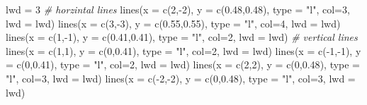 \documentclass[
]{book}
\newenvironment{Shaded}{\begin{snugshade}}{\end{snugshade}}
\newcommand{\AttributeTok}[1]{\textcolor[rgb]{0.77,0.63,0.00}{#1}}
\newcommand{\CommentTok}[1]{\textcolor[rgb]{0.56,0.35,0.01}{\textit{#1}}}
\newcommand{\DecValTok}[1]{\textcolor[rgb]{0.00,0.00,0.81}{#1}}
\newcommand{\FloatTok}[1]{\textcolor[rgb]{0.00,0.00,0.81}{#1}}
\newcommand{\FunctionTok}[1]{\textcolor[rgb]{0.00,0.00,0.00}{#1}}
\newcommand{\NormalTok}[1]{#1}
\newcommand{\OtherTok}[1]{\textcolor[rgb]{0.56,0.35,0.01}{#1}}
\newcommand{\SpecialCharTok}[1]{\textcolor[rgb]{0.00,0.00,0.00}{#1}}
\newcommand{\StringTok}[1]{\textcolor[rgb]{0.31,0.60,0.02}{#1}}
\begin{document}
\begin{Shaded}
\begin{Highlighting}[]
\NormalTok{lwd }\OtherTok{=} \DecValTok{3}
\CommentTok{\# horzintal lines}
\FunctionTok{lines}\NormalTok{(}\AttributeTok{x =} \FunctionTok{c}\NormalTok{(}\DecValTok{2}\NormalTok{,}\SpecialCharTok{{-}}\DecValTok{2}\NormalTok{), }\AttributeTok{y =} \FunctionTok{c}\NormalTok{(}\FloatTok{0.48}\NormalTok{,}\FloatTok{0.48}\NormalTok{), }\AttributeTok{type =} \StringTok{"l"}\NormalTok{, }\AttributeTok{col=}\DecValTok{3}\NormalTok{, }\AttributeTok{lwd =}\NormalTok{ lwd)}
\FunctionTok{lines}\NormalTok{(}\AttributeTok{x =} \FunctionTok{c}\NormalTok{(}\DecValTok{3}\NormalTok{,}\SpecialCharTok{{-}}\DecValTok{3}\NormalTok{), }\AttributeTok{y =} \FunctionTok{c}\NormalTok{(}\FloatTok{0.55}\NormalTok{,}\FloatTok{0.55}\NormalTok{), }\AttributeTok{type =} \StringTok{"l"}\NormalTok{, }\AttributeTok{col=}\DecValTok{4}\NormalTok{, }\AttributeTok{lwd =}\NormalTok{ lwd)}
\FunctionTok{lines}\NormalTok{(}\AttributeTok{x =} \FunctionTok{c}\NormalTok{(}\DecValTok{1}\NormalTok{,}\SpecialCharTok{{-}}\DecValTok{1}\NormalTok{), }\AttributeTok{y =} \FunctionTok{c}\NormalTok{(}\FloatTok{0.41}\NormalTok{,}\FloatTok{0.41}\NormalTok{), }\AttributeTok{type =} \StringTok{"l"}\NormalTok{, }\AttributeTok{col=}\DecValTok{2}\NormalTok{, }\AttributeTok{lwd =}\NormalTok{ lwd)}
\CommentTok{\# vertical lines}
\FunctionTok{lines}\NormalTok{(}\AttributeTok{x =} \FunctionTok{c}\NormalTok{(}\DecValTok{1}\NormalTok{,}\DecValTok{1}\NormalTok{), }\AttributeTok{y =} \FunctionTok{c}\NormalTok{(}\DecValTok{0}\NormalTok{,}\FloatTok{0.41}\NormalTok{), }\AttributeTok{type =} \StringTok{"l"}\NormalTok{, }\AttributeTok{col=}\DecValTok{2}\NormalTok{, }\AttributeTok{lwd =}\NormalTok{ lwd)}
\FunctionTok{lines}\NormalTok{(}\AttributeTok{x =} \FunctionTok{c}\NormalTok{(}\SpecialCharTok{{-}}\DecValTok{1}\NormalTok{,}\SpecialCharTok{{-}}\DecValTok{1}\NormalTok{), }\AttributeTok{y =} \FunctionTok{c}\NormalTok{(}\DecValTok{0}\NormalTok{,}\FloatTok{0.41}\NormalTok{), }\AttributeTok{type =} \StringTok{"l"}\NormalTok{, }\AttributeTok{col=}\DecValTok{2}\NormalTok{, }\AttributeTok{lwd =}\NormalTok{ lwd)}
\FunctionTok{lines}\NormalTok{(}\AttributeTok{x =} \FunctionTok{c}\NormalTok{(}\DecValTok{2}\NormalTok{,}\DecValTok{2}\NormalTok{), }\AttributeTok{y =} \FunctionTok{c}\NormalTok{(}\DecValTok{0}\NormalTok{,}\FloatTok{0.48}\NormalTok{), }\AttributeTok{type =} \StringTok{"l"}\NormalTok{, }\AttributeTok{col=}\DecValTok{3}\NormalTok{, }\AttributeTok{lwd =}\NormalTok{ lwd)}
\FunctionTok{lines}\NormalTok{(}\AttributeTok{x =} \FunctionTok{c}\NormalTok{(}\SpecialCharTok{{-}}\DecValTok{2}\NormalTok{,}\SpecialCharTok{{-}}\DecValTok{2}\NormalTok{), }\AttributeTok{y =} \FunctionTok{c}\NormalTok{(}\DecValTok{0}\NormalTok{,}\FloatTok{0.48}\NormalTok{), }\AttributeTok{type =} \StringTok{"l"}\NormalTok{, }\AttributeTok{col=}\DecValTok{3}\NormalTok{, }\AttributeTok{lwd =}\NormalTok{ lwd)}

\end{Highlighting}
\end{Shaded}
\end{document}
